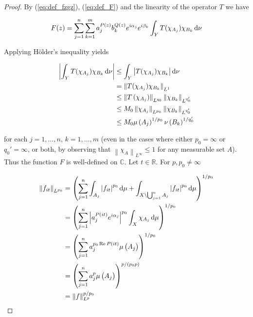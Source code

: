 \begin{proof}
By (\ref{eq:def_fzgz}), (\ref{eq:def_F}) and the linearity of the operator $T$ we have

\begin{gather*}
	F(z) = \sum_{j = 1}^n\sum_{k = 1}^m a^{P(z)}_j b_k^{Q(z)} e^{i\alpha_j} e^{i\beta_k} \int_YT(\chi_{A_j})\chi_{B_k}\mathop{}\!\mathrm{d}\nu
\end{gather*}

Applying H\"older's inequality yields

\begin{equation}
	\begin{aligned}
		\left| \int_YT(\chi_{A_j})\chi_{B_k}\d\nu \right| &\leq \int_Y\left| T(\chi_{A_j})\chi_{B_k}\right|\d\nu\\
		&= \norm[0]{T(\chi_{A_j})\chi_{B_k}}_{L^1}\\
		&\leq \norm[0]{T\del[0]{\chi_{A_j}}}_{L^{q_0}} \norm[0]{\chi_{B_k}}_{L^{q_0'}}\\
		&\leq M_0\norm[0]{\chi_{A_j}}_{L^{p_0}} \norm[0]{\chi_{B_k}}_{L^{q_0'}}\\
		&\leq M_0 \mu\del[0]{A_j}^{1/p_0}\nu\del[0]{B_k}^{1/q_0'}
		\label{est:constant_F}		
	\end{aligned}
\end{equation}

\noindent for each $j = 1,\hdots,n$, $k = 1,\hdots,m$ (even in the cases where either $p_0 = \infty$ or $q_0' = \infty$, or both, by observing that $\left\| \chi_{A}\right\|_{L^\infty} \leq 1$ for any measurable set $A$). Thus the function $F$ is well-defined on $\mathbb{C}$. Let $t \in \mathbb{R}$. For $p,p_0 \neq \infty$

\begin{gather*}
	\begin{aligned}
		\left\|f_{it}\right\|_{L^{p_0}} &= \left(\sum_{j = 1}^n \int_{A_j} \left| f_{it} \right|^{p_0} \mathop{}\!\mathrm{d}\mu + \int_{X \setminus \bigcup_{j = 1}^n A_j} \left| f_{it} \right|^{p_0} \mathop{}\!\mathrm{d}\mu\right)^{1/p_0}\\
		&= \left(\sum_{j = 1}^n \left| a_j^{P(it)} e^{i\alpha_j}\right|^{p_0}\int_X \chi_{A_j} \mathop{}\!\mathrm{d}\mu\right)^{1/p_0}\\
		&= \left(\sum_{j = 1}^n a_j^{p_0\operatorname{Re} P(it)}\mu\left(A_j\right)\right)^{1/p_0}\\
		&= \left(\sum_{j = 1}^n a_j^p\mu\left(A_j\right)\right)^{p/\left(p_0p\right)}\\
		&= \left\|f\right\|_{L^p}^{p/p_0} 
	\end{aligned}
\end{gather*}


\end{proof}
